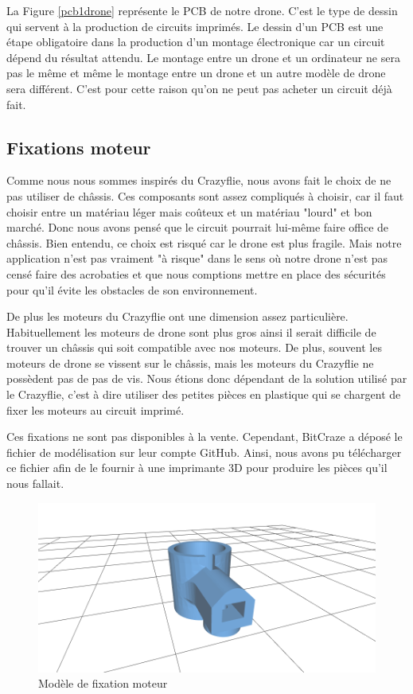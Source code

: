 \documentclass[a4paper,10pt]{report}
\begin{document}
      La Figure \ref{pcb1drone} représente le PCB de notre drone. C'est le type 
de dessin qui servent à la production de circuits imprimés. Le dessin d'un PCB 
est une étape obligatoire dans la production d'un montage électronique car un 
circuit dépend du résultat attendu. Le montage entre un drone et un ordinateur 
ne sera pas le même et même le montage entre un drone et un autre modèle de 
drone sera différent. C'est pour cette raison qu'on ne peut pas acheter un 
circuit déjà fait.
      
      \subsection{Fixations moteur}
	Comme nous nous sommes inspirés du Crazyflie, nous avons fait le choix 
de ne pas utiliser de châssis. Ces composants sont assez compliqués à choisir, 
car il faut choisir entre un matériau léger mais coûteux et un matériau "lourd" 
et bon marché. Donc nous avons pensé que le circuit pourrait lui-même faire 
office de châssis. Bien entendu, ce choix est risqué car le drone est plus 
fragile. Mais notre application n'est pas vraiment "à risque" dans le sens où 
notre drone n'est pas censé faire des acrobaties et que nous comptions mettre en 
place des sécurités pour qu'il évite les obstacles de son environnement.

	De plus les moteurs du Crazyflie ont une dimension assez particulière. 
Habituellement les moteurs de drone sont plus gros ainsi il serait difficile de 
trouver un châssis qui soit compatible avec nos moteurs. De plus, souvent les 
moteurs de drone se vissent sur le châssis, mais les moteurs du Crazyflie ne 
possèdent pas de pas de vis. Nous étions donc dépendant de la solution utilisé 
par le Crazyflie, c'est à dire utiliser des petites pièces en plastique qui se 
chargent de fixer les moteurs au circuit imprimé.

	Ces fixations ne sont pas disponibles à la vente. Cependant, BitCraze a 
déposé le fichier de modélisation sur leur compte GitHub\cite{gitbit}. Ainsi, 
nous avons pu télécharger ce fichier afin de le fournir à une imprimante 3D 
pour produire les pièces qu'il nous fallait.

      \begin{figure}[htbp]%
	\centering
	\includegraphics[scale = 0.4]{img/model_fixation.png}
	\caption{Modèle de fixation moteur}
	\label{fixationmodel}
      \end{figure}
      
\end{document}
